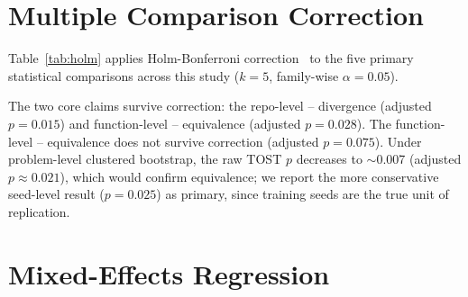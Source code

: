 \section{Multiple Comparison Correction}
\label{app:holm}

Table~\ref{tab:holm} applies Holm-Bonferroni correction~\cite{holm1979} to the five primary statistical comparisons across this study ($k{=}5$, family-wise $\alpha{=}0.05$).

\begin{table}[h]
\centering
\small
\caption{Holm-Bonferroni correction for primary comparisons ($k{=}5$). Comparisons ranked by raw $p$-value; each tested against $\alpha / (k - \text{rank} + 1)$.}
\label{tab:holm}
\setlength{\tabcolsep}{3pt}
\end{table}

The two core claims survive correction: the repo-level \cls{}--\cwm{} divergence (adjusted $p{=}0.015$) and function-level \cls{}--\cwm{} equivalence (adjusted $p{=}0.028$). The function-level \cls{}--\traj{} equivalence does not survive correction (adjusted $p{=}0.075$). Under problem-level clustered bootstrap, the raw TOST $p$ decreases to ${\sim}$0.007 (adjusted $p{\approx}0.021$), which would confirm equivalence; we report the more conservative seed-level result ($p{=}0.025$) as primary, since training seeds are the true unit of replication.

\section{Mixed-Effects Regression}
\label{app:interaction}

